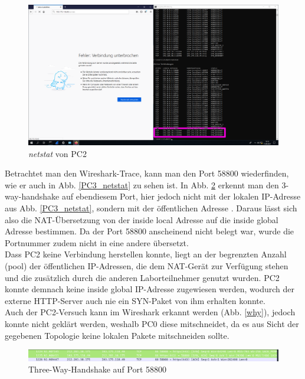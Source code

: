 \documentclass[11pt, a4paper]{article}
\begin{document}
\begin{figure}[H]
  \centering
  \includegraphics[width=\textwidth]
  {graphics/bilder/31/PC_2_zweiterversuch_nichtverbunden}
  \caption{\emph{netstat} von PC2}\label{PC2_netstat}
\end{figure}

Betrachtet man den Wireshark-Trace, kann man den Port 58800 wiederfinden, wie
er auch in Abb. \ref{PC3_netstat} zu sehen ist. In Abb. \ref{58800_handshake}
erkennt man den 3-way-handshake auf ebendiesem Port, hier jedoch nicht mit der
lokalen IP-Adresse aus Abb. \ref{PC3_netstat}, sondern mit der öffentlichen
Adresse . Daraus lässt sich also die NAT-Übersetzung
von der inside local Adresse  auf die inside
global Adresse  bestimmen. Da der Port 58800
anscheinend nicht belegt war, wurde die Portnummer zudem nicht in eine
andere übersetzt.\\

Dass PC2 keine Verbindung herstellen konnte, liegt an der begrenzten Anzahl
(pool) der öffentlichen IP-Adressen, die dem NAT-Gerät zur Verfügung stehen und
die zusätzlich durch die anderen Laborteilnehmer genutzt wurden. PC2 konnte
demnach keine inside global IP-Adresse zugewiesen werden, wodurch der externe
HTTP-Server auch nie ein SYN-Paket von ihm erhalten konnte.\\

Auch der PC2-Versuch kann im Wireshark erkannt werden (Abb. \ref{why}), jedoch
konnte nicht geklärt werden, weshalb PC0 diese mitschneidet, da es aus Sicht
der gegebenen Topologie keine lokalen Pakete mitschneiden sollte.\\

\begin{figure}[H]
  \centering
  \includegraphics[width=\textwidth]
  {graphics/bilder/31/ws_58800_handshake}
  \caption{Three-Way-Handshake auf Port 58800}\label{58800_handshake}
\end{figure}
\end{document}
